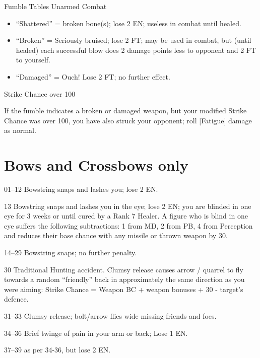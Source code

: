 \begin{Chapter}{Fumble Tables}
Unarmed Combat  

\begin{itemize}
\item  “Shattered” = broken bone(s); lose 2 EN; useless in combat until healed.  
\item  “Broken” = Seriously bruised; lose 2 FT; may be used  in  combat,  but  (until  healed)  each  successful 
blow does 2 damage points less to opponent and 2 FT to yourself.  
\item  “Damaged”  =  Ouch!  Lose  2  FT;  no  further  effect. 
\end{itemize}

Strike Chance over 100 

If the fumble indicates a broken or damaged weapon, but your modified
Strike Chance was over 100, you have also struck your opponent; roll
[Fatigue] damage as normal.

\section{Bows and Crossbows only}
\label{fumble:bows}
\begin{Description}

\item[01–12] Bowstring snaps and lashes you; lose 2 EN.

\item[13] Bowstring snaps and lashes you in the eye; lose 2 EN; you
  are blinded in one eye for 3 weeks or until cured by a Rank 7
  Healer. A figure who is blind in one eye suffers the following
  subtractions: 1 from MD, 2 from PB, 4 from Perception and reduces
  their base chance with any missile or thrown weapon by 30.

\item[14–29] Bowstring snaps; no further penalty.

\item[30] Traditional Hunting accident. Clumsy release causes arrow /
  quarrel to fly towards a random “friendly” back in approximately the
  same direction as you were aiming: Strike Chance = Weapon BC +
  weapon bonuses + 30 - target’s defence.

\item[31–33]  Clumsy release; bolt/arrow flies wide missing friends and foes. 

\item[34–36] Brief twinge of pain in your arm or back; Lose 1 EN.

\item[37–39] as per 34-36, but lose 2 EN.


\end{Description}
\end{Chapter}
